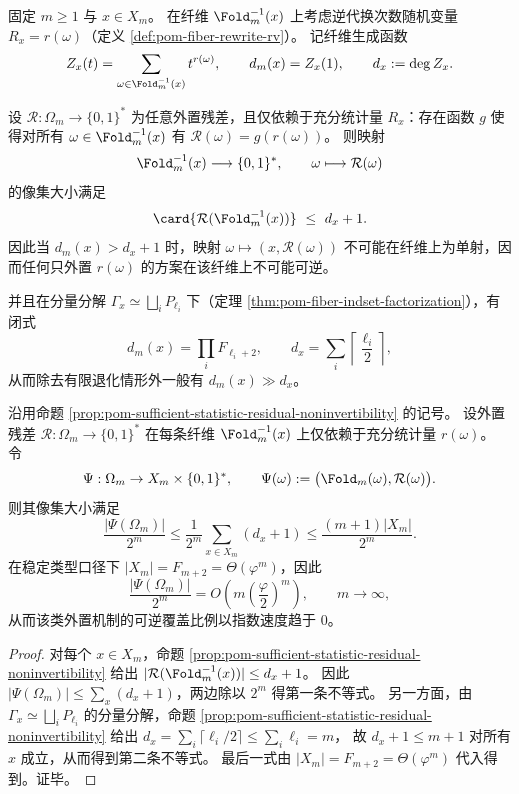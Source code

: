 \begin{proposition}[充分统计量外置与可逆外置的结构性不相容]\label{prop:pom-sufficient-statistic-residual-noninvertibility}
固定 \(m\ge 1\) 与 \(x\in X_m\)。
在纤维 \(\Fold_m^{-1}(x)\) 上考虑逆代换次数随机变量 \(R_x=r(\omega)\)（定义 \ref{def:pom-fiber-rewrite-rv}）。
记纤维生成函数
\[
Z_x(t)=\sum_{\omega\in\Fold_m^{-1}(x)} t^{r(\omega)},
\qquad
d_m(x)=Z_x(1),
\qquad
d_x:=\deg Z_x.
\]
\par
设 \(\mathcal R:\Omega_m\to\{0,1\}^{\ast}\) 为任意外置残差，且仅依赖于充分统计量 \(R_x\)：存在函数 \(g\) 使得对所有 \(\omega\in\Fold_m^{-1}(x)\) 有
\(
\mathcal R(\omega)=g(r(\omega))
\)。
则映射
\[
\Fold_m^{-1}(x)\longrightarrow \{0,1\}^{\ast},
\qquad
\omega\longmapsto \mathcal R(\omega)
\]
的像集大小满足
\[
\card{\mathcal R(\Fold_m^{-1}(x))}\ \le\ d_x+1.
\]
因此当 \(d_m(x)>d_x+1\) 时，映射
\(
\omega\mapsto (x,\mathcal R(\omega))
\)
不可能在纤维上为单射，因而任何只外置 \(r(\omega)\) 的方案在该纤维上不可能可逆。
\par
并且在分量分解 \(\Gamma_x\simeq\bigsqcup_i P_{\ell_i}\) 下（定理 \ref{thm:pom-fiber-indset-factorization}），有闭式
\[
d_m(x)=\prod_i F_{\ell_i+2},
\qquad
d_x=\sum_i \left\lceil\frac{\ell_i}{2}\right\rceil,
\]
从而除去有限退化情形外一般有 \(d_m(x)\gg d_x\)。
\end{proposition}

\begin{corollary}[充分统计量外置的全局可逆覆盖比例上界]\label{cor:pom-sufficient-statistic-residual-global-coverage}
沿用命题 \ref{prop:pom-sufficient-statistic-residual-noninvertibility} 的记号。
设外置残差 \(\mathcal R:\Omega_m\to\{0,1\}^{\ast}\) 在每条纤维 \(\Fold_m^{-1}(x)\) 上仅依赖于充分统计量 \(r(\omega)\)。
令
\[
\Psi:\Omega_m\to X_m\times\{0,1\}^{\ast},
\qquad
\Psi(\omega):=\bigl(\Fold_m(\omega),\mathcal R(\omega)\bigr).
\]
则其像集大小满足
\[
\frac{|\Psi(\Omega_m)|}{2^m}
\le
\frac{1}{2^m}\sum_{x\in X_m}(d_x+1)
\le
\frac{(m+1)|X_m|}{2^m}.
\]
在稳定类型口径下 \(|X_m|=F_{m+2}=\Theta(\varphi^m)\)，因此
\[
\frac{|\Psi(\Omega_m)|}{2^m}
=
O\!\left(m\left(\frac{\varphi}{2}\right)^m\right),
\qquad m\to\infty,
\]
从而该类外置机制的可逆覆盖比例以指数速度趋于 \(0\)。
\end{corollary}
\begin{proof}
对每个 \(x\in X_m\)，命题 \ref{prop:pom-sufficient-statistic-residual-noninvertibility} 给出
\(
|\mathcal R(\Fold_m^{-1}(x))|\le d_x+1
\)。
因此 \(|\Psi(\Omega_m)|\le \sum_x(d_x+1)\)，两边除以 \(2^m\) 得第一条不等式。
另一方面，由 \(\Gamma_x\simeq\bigsqcup_i P_{\ell_i}\) 的分量分解，命题 \ref{prop:pom-sufficient-statistic-residual-noninvertibility} 给出
\(
d_x=\sum_i\lceil \ell_i/2\rceil\le \sum_i \ell_i=m
\)，
故 \(d_x+1\le m+1\) 对所有 \(x\) 成立，从而得到第二条不等式。
最后一式由 \(|X_m|=F_{m+2}=\Theta(\varphi^m)\) 代入得到。证毕。
\end{proof}

